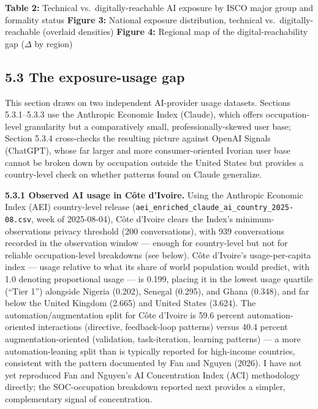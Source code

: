 \documentclass[
  11pt,
]{article}
\begin{document}
\textbf{Table 2:} Technical vs.~digitally-reachable AI exposure by ISCO
major group and formality status \textbf{Figure 3:} National exposure
distribution, technical vs.~digitally-reachable (overlaid densities)
\textbf{Figure 4:} Regional map of the digital-reachability gap
(\(\Delta\) by region)

\subsection{5.3 The exposure-usage gap}\label{the-exposure-usage-gap}

This section draws on two independent AI-provider usage datasets.
Sections 5.3.1--5.3.3 use the Anthropic Economic Index (Claude), which
offers occupation-level granularity but a comparatively small,
professionally-skewed user base; Section 5.3.4 cross-checks the
resulting picture against OpenAI Signals (ChatGPT), whose far larger and
more consumer-oriented Ivorian user base cannot be broken down by
occupation outside the United States but provides a country-level check
on whether patterns found on Claude generalize.

\textbf{5.3.1 Observed AI usage in Côte d'Ivoire.} Using the Anthropic
Economic Index (AEI) country-level release
(\texttt{aei\_enriched\_claude\_ai\_country\_2025-08.csv}, week of
2025-08-04), Côte d'Ivoire clears the Index's minimum-observations
privacy threshold (200 conversations), with 939 conversations recorded
in the observation window --- enough for country-level but not for
reliable occupation-level breakdowns (see below). Côte d'Ivoire's
usage-per-capita index --- usage relative to what its share of world
population would predict, with 1.0 denoting proportional usage --- is
0.199, placing it in the lowest usage quartile (``Tier 1'') alongside
Nigeria (0.202), Senegal (0.295), and Ghana (0.348), and far below the
United Kingdom (2.665) and United States (3.624). The
automation/augmentation split for Côte d'Ivoire is 59.6 percent
automation-oriented interactions (directive, feedback-loop patterns)
versus 40.4 percent augmentation-oriented (validation, task-iteration,
learning patterns) --- a more automation-leaning split than is typically
reported for high-income countries, consistent with the pattern
documented by Fan and Nguyen (2026). I have not yet reproduced Fan and
Nguyen's AI Concentration Index (ACI) methodology directly; the
SOC-occupation breakdown reported next provides a simpler, complementary
signal of concentration.
\end{document}

